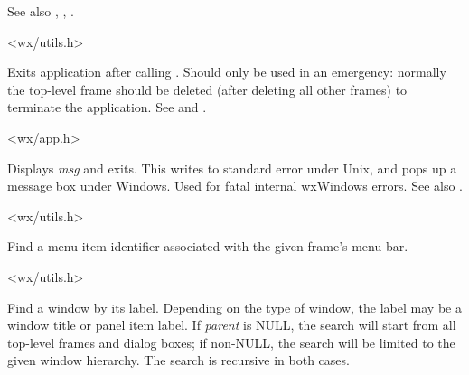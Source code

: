 See also , , 
.


<wx/utils.h>

\label{wxexit}


Exits application after calling .
Should only be used in an emergency: normally the top-level frame
should be deleted (after deleting all other frames) to terminate the
application. See  and .


<wx/app.h>

\label{wxfatalerror}


Displays {\it msg} and exits. This writes to standard error under Unix,
and pops up a message box under Windows. Used for fatal internal
wxWindows errors. See also .


<wx/utils.h>



Find a menu item identifier associated with the given frame's menu bar.


<wx/utils.h>



Find a window by its label. Depending on the type of window, the label may be a window title
or panel item label. If {\it parent} is NULL, the search will start from all top-level
frames and dialog boxes; if non-NULL, the search will be limited to the given window hierarchy.
The search is recursive in both cases.



